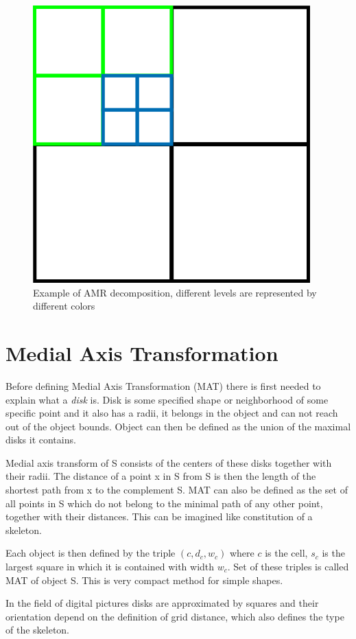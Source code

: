 \begin{figure}
\centering
\includegraphics[scale=0.5]{amr_obr.png}
\caption{Example of AMR decomposition, different levels are represented by different colors}
\end{figure}

\section{Medial Axis Transformation}
Before defining Medial Axis Transformation (MAT) there is first needed to explain what a \textit{disk} is.
Disk is some specified shape or neighborhood of some specific point and it also has a radii, it belongs in the object and can not reach out of the object bounds. Object can then be defined as the union of the maximal disks it contains.

Medial axis transform of S consists of the centers of these disks together with their radii. The distance of a point x in S from S is then the length of the shortest path from x to the complement S. MAT can also be defined as the set of all points in S which do not belong to the minimal path of any other point, together with their distances. This can be imagined like constitution of a skeleton.

Each object is then defined by the triple $(c, d_c, w_c)$ where $c$ is the cell, $s_c$ is the largest square in which it is contained with width $w_c$. Set of these triples is called MAT of object S. This is very compact method for simple shapes.

In the field of digital pictures disks are approximated by squares and their orientation depend on the definition of grid distance, which also defines the type of the skeleton.

